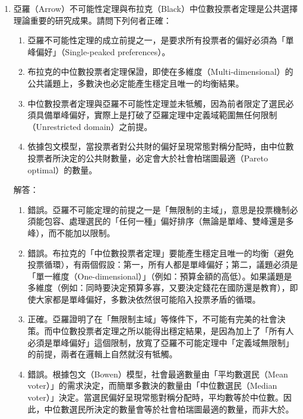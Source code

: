 \documentclass[12pt, a4paper]{article}
\begin{document}
\begin{enumerate}
    \item 亞羅（Arrow）不可能性定理與布拉克（Black）中位數投票者定理是公共選擇理論重要的研究成果。請問下列何者正確：
    \begin{enumerate}[label=\Alph*.]
        \item 亞羅不可能性定理的成立前提之一，是要求所有投票者的偏好必須為「單峰偏好」（Single-peaked preferences）。
        \item 布拉克的中位數投票者定理保證，即使在多維度（Multi-dimensional）的公共議題上，多數決也必定能產生穩定且唯一的均衡結果。
        \item 中位數投票者定理與亞羅不可能性定理並未牴觸，因為前者限定了選民必須具備單峰偏好，實際上是打破了亞羅定理中定義域範圍無任何限制（Unrestricted domain）之前提。
        \item 依據包文模型，當投票者對公共財的偏好呈現常態對稱分配時，由中位數投票者所決定的公共財數量，必定會大於社會柏瑞圖最適（Pareto optimal）的數量。
    \end{enumerate}
    解答：
    \begin{enumerate}[label=\Alph*.]
        \item 錯誤。亞羅不可能定理的前提之一是「無限制的主域」，意思是投票機制必須能包容、處理選民的「任何一種」偏好排序（無論是單峰、雙峰還是多峰），而不能加以限制。
        \item 錯誤。布拉克的「中位數投票者定理」要能產生穩定且唯一的均衡（避免投票循環），有兩個假設：第一，所有人都是單峰偏好；第二，議題必須是「單一維度（One-dimensional）」（例如：預算金額的高低）。如果議題是多維度（例如：同時要決定預算多寡，又要決定錢花在國防還是教育），即使大家都是單峰偏好，多數決依然很可能陷入投票矛盾的循環。
        \item 正確。亞羅證明了在「無限制主域」等條件下，不可能有完美的社會決策。而中位數投票者定理之所以能得出穩定結果，是因為加上了「所有人必須是單峰偏好」這個限制，放寬了亞羅不可能定理中「定義域無限制」的前提，兩者在邏輯上自然就沒有牴觸。
        \item 錯誤。根據包文（Bowen）模型，社會最適數量由「平均數選民（Mean voter）」的需求決定，而簡單多數決的數量由「中位數選民（Median voter）」決定。當選民偏好呈現常態對稱分配時，平均數等於中位數。因此，中位數選民所決定的數量會等於社會柏瑞圖最適的數量，而非大於。
    \end{enumerate}


\end{enumerate}
\end{document}
